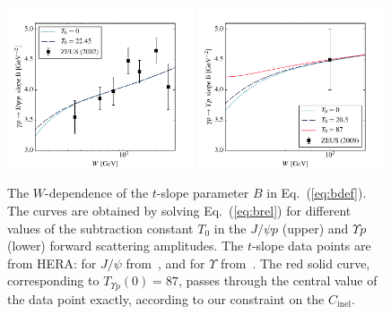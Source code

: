 \documentclass[prd,amsmath,%
twocolumn,floatfix,amssymb, preprintnumbers, linenumbers,nofootinbib, superscriptaddress]{revtex4}
\begin{document}
 
\begin{figure}[h]
\includegraphics[width=0.49\textwidth]{b_slope_jpsi.pdf}
\includegraphics[width=0.49\textwidth]{b_slope_y.pdf}
\caption{
The $W$-dependence of the $t$-slope parameter $B$ in  Eq.~(\ref{eq:bdef}). The curves are obtained by solving 
Eq.~(\ref{eq:brel}) for different values of the subtraction constant $T_0$ in the $J/\psi p $ (upper)  and $\Upsilon p$ (lower) forward scattering amplitudes.
The $t$-slope data points are from HERA: for $J/\psi$ from~\cite{Chekanov:2002xi}, 
and for $\Upsilon$ from~\cite{Chekanov:2009zz}. 
The red solid curve, corresponding to $T_{\Upsilon p}(0)=87$, passes through the central value of the data point exactly, according to our constraint on the $C_\mathrm{inel}$.
}
\label{fig:bslope}
\end{figure}
\end{document}
